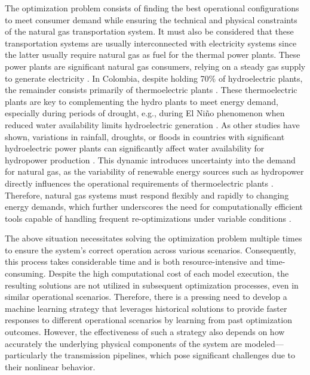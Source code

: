 The optimization problem consists of finding the best operational configurations to meet consumer demand while ensuring the technical and physical constraints of the natural gas transportation system.  It must also be considered that these transportation systems are usually interconnected with electricity systems since the latter usually require natural gas as fuel for the thermal power plants. These power plants are significant natural gas consumers, relying on a steady gas supply to generate electricity \cite{Byeon_Van_Hentenryck_2020}. In Colombia, despite holding 70\% of hydroelectric plants, the remainder consists primarily of thermoelectric plants \cite{Morcillo_Angulo_Franco_2020a}. These thermoelectric plants are key to complementing the hydro plants to meet energy demand, especially during periods of drought, e.g., during El Niño phenomenon when reduced water availability limits hydroelectric generation \cite{droughts_colombia}. As other studies have shown, variations in rainfall, droughts, or floods in countries with significant hydroelectric power plants can significantly affect water availability for hydropower production \cite{Cuartas_Cunha_Alves_Parra_Deusdará_Leal_Costa_Molina_Amore_Broedel_Seluchi_et_al_2022}. This dynamic introduces uncertainty into the demand for natural gas, as the variability of renewable energy sources such as hydropower directly influences the operational requirements of thermoelectric plants \cite{Bessa_Moreira_Silva_Matos_2019}. Therefore, natural gas systems must respond flexibly and rapidly to changing energy demands, which further underscores the need for computationally efficient tools capable of handling frequent re-optimizations under variable conditions \cite{9831787}.

The above situation necessitates solving the optimization problem multiple times to ensure the system's correct operation across various scenarios. Consequently, this process takes considerable time and is both resource-intensive and time-consuming. Despite the high computational cost of each model execution, the resulting solutions are not utilized in subsequent optimization processes, even in similar operational scenarios. Therefore, there is a pressing need to develop a machine learning strategy that leverages historical solutions to provide faster responses to different operational scenarios by learning from past optimization outcomes. However, the effectiveness of such a strategy also depends on how accurately the underlying physical components of the system are modeled—particularly the transmission pipelines, which pose significant challenges due to their nonlinear behavior.

